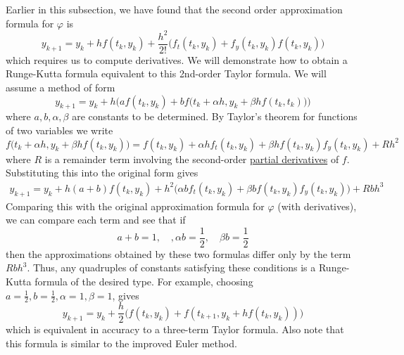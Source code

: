 \documentclass{article}
\newcounter{theorem}[section]
\newcounter{example}[section]
\begin{document}
    \begin{example}
      \label{ex:deriving-a-runge-kutta-formula-equivalent-to}
    Earlier in this subsection, we have found that the second order approximation formula for $\varphi$ is 
    \begin{equation}
      y_{k+1} = y_k + h f(t_k, y_k) + \frac{h^2}{2!} \big( f_t (t_k, y_k) + f_y (t_k, y_k) f(t_k, y_k)\big)
    \end{equation}
    which requires us to compute derivatives. We will demonstrate how to obtain a Runge-Kutta formula equivalent to this 2nd-order Taylor formula. We will assume a method of form 
    \begin{equation}
      y_{k+1} = y_k + h \Big( af(t_k, y_k) + b f\big( t_k + \alpha h, y_k + \beta h f(t_k, t_k)\big)\Big)
    \end{equation}
    where $a, b, \alpha, \beta$ are constants to be determined. By Taylor's theorem for functions of two variables we write
    \begin{equation}
      f\big(t_k + \alpha h, y_k + \beta h f(t_k, y_k)\big) = f(t_k, y_k) + \alpha h f_t (t_k, y_k) + \beta h f(t_k, y_k) f_y (t_k, y_k) + R h^2
    \end{equation}
    where $R$ is a remainder term involving the second-order \hyperref[mv-def:partial-derivative]{partial derivatives} of $f$. Substituting this into the original form gives
    \begin{align*}
        y_{k+1} = y_k + h(a + b) f(t_k, y_k) + h^2 \big( \alpha b f_t (t_k, y_k) + \beta b f(t_k, y_k) f_y (t_k, y_k)\big) + R b h^3
    \end{align*}
    Comparing this with the original approximation formula for $\varphi$ (with derivatives), we can compare each term and see that if
    \begin{equation}
      a + b = 1, \quad, \alpha b = \frac{1}{2}, \quad \beta b = \frac{1}{2}
    \end{equation}
    then the approximations obtained by these two formulas differ only by the term $R b h^3$. Thus, any quadruples of constants satisfying these conditions is a Runge-Kutta formula of the desired type. For example, choosing $a = \frac{1}{2}, b = \frac{1}{2}, \alpha = 1, \beta = 1$, gives
    \begin{equation}
      y_{k+1} = y_k + \frac{h}{2} \big( f(t_k, y_k) + f(t_{k+1}, y_k + h f(t_k, y_k))\big)
    \end{equation}
    which is equivalent in accuracy to a three-term Taylor formula. Also note that this formula is similar to the improved Euler method. 
    \end{example}
\end{document}

